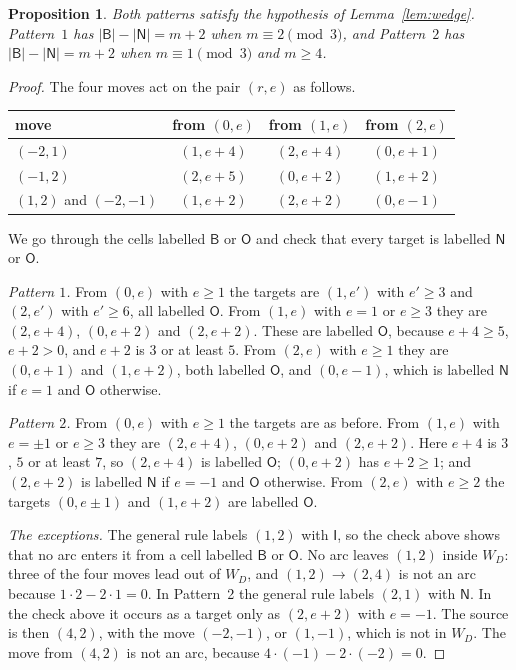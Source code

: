 \documentclass[11pt]{amsart}
\newtheorem{proposition}[theorem]{Proposition}
\theoremstyle{remark}
\begin{document}
\begin{proposition}\label{prop:diaglabel}
Both patterns satisfy the hypothesis of Lemma~\ref{lem:wedge}. Pattern~$1$ has $|\mathsf B|-|\mathsf N|=m+2$ when
$m\equiv2\pmod3$, and Pattern~$2$ has $|\mathsf B|-|\mathsf N|=m+2$ when $m\equiv1\pmod3$ and $m\ge4$.
\end{proposition}
\begin{proof}
The four moves act on the pair $(r,e)$ as follows.
\begin{center}\small
\begin{tabular}{lccc}
\toprule
move & from $(0,e)$ & from $(1,e)$ & from $(2,e)$\\
\midrule
$(-2,1)$ & $(1,e+4)$ & $(2,e+4)$ & $(0,e+1)$\\
$(-1,2)$ & $(2,e+5)$ & $(0,e+2)$ & $(1,e+2)$\\
$(1,2)$ and $(-2,-1)$ & $(1,e+2)$ & $(2,e+2)$ & $(0,e-1)$\\
\bottomrule
\end{tabular}
\end{center}
We go through the cells labelled $\mathsf B$ or $\mathsf O$ and check that every target is labelled $\mathsf N$ or
$\mathsf O$.

\emph{Pattern $1$.} From $(0,e)$ with $e\ge1$ the targets are $(1,e')$ with $e'\ge3$ and $(2,e')$ with $e'\ge6$,
all labelled $\mathsf O$. From $(1,e)$ with $e=1$ or $e\ge3$ they are $(2,e+4)$, $(0,e+2)$ and $(2,e+2)$. These are
labelled $\mathsf O$, because $e+4\ge5$, $e+2>0$, and $e+2$ is $3$ or at least $5$. From $(2,e)$ with $e\ge1$ they
are $(0,e+1)$ and $(1,e+2)$, both labelled $\mathsf O$, and $(0,e-1)$, which is labelled $\mathsf N$ if $e=1$ and
$\mathsf O$ otherwise.

\emph{Pattern $2$.} From $(0,e)$ with $e\ge1$ the targets are as before. From $(1,e)$ with $e=\pm1$ or $e\ge3$ they
are $(2,e+4)$, $(0,e+2)$ and $(2,e+2)$. Here $e+4$ is $3$, $5$ or at least $7$, so $(2,e+4)$ is labelled $\mathsf O$;
$(0,e+2)$ has $e+2\ge1$; and $(2,e+2)$ is labelled $\mathsf N$ if $e=-1$ and $\mathsf O$ otherwise. From $(2,e)$ with $e\ge2$ the targets $(0,e\pm1)$ and $(1,e+2)$ are labelled $\mathsf O$.

\emph{The exceptions.} The general rule labels $(1,2)$ with $\mathsf I$, so the check above shows that no arc
enters it from a cell labelled $\mathsf B$ or $\mathsf O$. No arc leaves $(1,2)$ inside $W_D$: three of the four moves
lead out of $W_D$, and $(1,2)\to(2,4)$ is not an arc because $1\cdot2-2\cdot1=0$. In Pattern~2 the general rule
labels $(2,1)$ with $\mathsf N$. In the check above it occurs as a target only as $(2,e+2)$ with $e=-1$. The source is then
$(4,2)$, with the move $(-2,-1)$, or $(1,-1)$, which is not in $W_D$. The move from $(4,2)$ is not an arc, because
$4\cdot(-1)-2\cdot(-2)=0$.


\end{proof}
\end{document}
